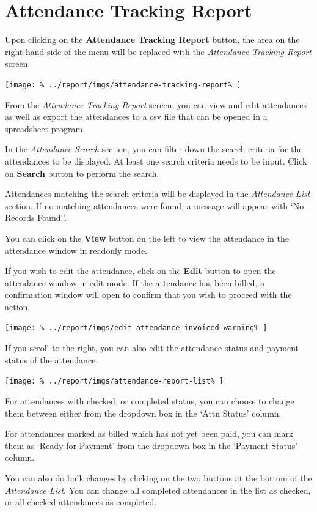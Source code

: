 \documentclass[../main/main]{subfiles}
\begin{document}
\newpage
\section{Attendance Tracking Report}
\label{sec:attendance-tracking-report}

Upon clicking on the \textbf{Attendance Tracking Report} button,
the area on the right-hand side of the menu will be replaced with the
\emph{Attendance Tracking Report} screen.

\texttt{[image: \%
  ../report/imgs/attendance-tracking-report\%
]}

From the \emph{Attendance Tracking Report} screen, you can view and edit
attendances as well as export the attendances to a csv file that can be opened
in a spreadsheet program.

In the \emph{Attendance Search} section, you can filter down the search criteria
for the attendances to be displayed. At least one search criteria needs to be
input. Click on \textbf{Search} button to perform the search.

Attendances matching the search criteria will be displayed in the
\emph{Attendance List} section. If no matching attendances were found, a
message will appear with `No Records Found!'.

You can click on the \textbf{View} button on the left to view the attendance
in the attendance window in readonly mode.

If you wish to edit the attendance, click on the \textbf{Edit} button to open
the attendance window in edit mode. If the attendance has been billed,
a confirmation window will open to confirm that you wish to proceed with the
action.

\texttt{[image: \%
  ../report/imgs/edit-attendance-invoiced-warning\%
]}

If you scroll to the right, you can also edit the attendance status and payment
status of the attendance.

\texttt{[image: \%
  ../report/imgs/attendance-report-list\%
]}

For attendances with checked, or completed status, you can choose to change them
between either from the dropdown box in the `Attn Status' column.

For attendances marked as billed which has not yet been paid, you can mark
them as `Ready for Payment' from the dropdown box in the `Payment Status'
column.

You can also do bulk changes by clicking on the two buttons at the bottom of the
\emph{Attendance List}. You can change all completed attendances in the list
as checked, or all checked attendances as completed.
\end{document}
